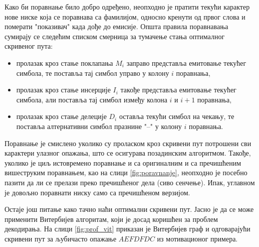 \documentclass[12pt,oneside]{memoir}
\begin{document}
\begin{CJK}{UTF8}{ipxm}
Како би поравнање било добро одређено, неопходно је пратити текући карактер нове ниске која се поравнава са фамилијом, односно кренути од првог слова и померати "показивач" када дође до емисије. Општа правила поравнавања сумирају се следећим списком смерница за тумачење стања оптималног скривеног пута:
\begin{itemize}
  \item пролазак кроз стање поклапања $M_i$ заправо представља емитовање текућег симбола, те поставља тај симбол управо у колону $i$ поравнања,
  \item пролазак кроз стање инсерције $I_i$ такође представља емитовање текућег симбола, али поставља тај симбол између колона $i$ и $i+1$ поравнања,
  \item пролазак кроз стање делеције $D_i$ оставља текући симбол на чекању, те поставља алтернативни симбол празнине "--" у колону $i$ поравнања.
\end{itemize}
Поравнање је смислено уколико су проласком кроз скривени пут потрошени сви карактери улазног опажања, што се осигурава позадинским алгоритмом. Такође, уколико је циљ истовремено поравнање и са оригиналним и са пречишћеним вишеструким поравнањем, као на слици \ref{fig:poravnanje}, неопходно је посебно пазити да ли се прелази преко пречишћеног дела (сиво сенчење). Ипак, углавном је довољно поравнати ниску само са пречишћеном верзијом.

Остаје још питање како тачно наћи оптимални скривени пут. Јасно је да се може применити Витербијев алгоритам, који је досад коришћен за проблем декодирања. На слици \ref{fig:prof_vit} приказан је Витербијев граф и одговарајући скривени пут за љубичасто опажање $AEFDFDC$ из мотивационог примера.


\end{CJK}
\end{document}
